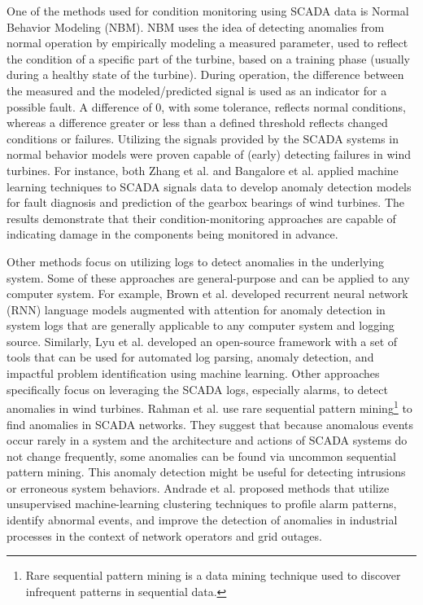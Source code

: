 \par One of the methods used for condition monitoring using SCADA data is Normal Behavior
Modeling (NBM). NBM uses the idea of detecting anomalies from normal operation by
empirically modeling a measured parameter, used to reflect the condition of a specific part of
the turbine, based on a training phase (usually during a healthy state of the turbine). During
operation, the difference between the measured and the modeled/predicted signal is used as an
indicator for a possible fault. A difference of 0, with some tolerance, reflects normal conditions,
whereas a difference greater or less than a defined threshold reflects changed conditions or failures. Utilizing the signals provided 
by the SCADA systems in normal behavior models were proven capable of (early) detecting failures in wind turbines.
For instance, both Zhang et al. \cite{Zhang_Wang} and Bangalore et al. \cite{Bangalore_1} applied machine learning techniques to SCADA signals data to develop anomaly detection models 
for fault diagnosis and prediction of the gearbox bearings of wind turbines. 
The results demonstrate that their condition-monitoring approaches are capable of indicating damage in the components being monitored in advance.

\par Other methods focus on utilizing logs to detect anomalies in the underlying system. Some of these approaches are general-purpose 
and can be applied to any computer system. For example, Brown et al. \cite{RNN} developed recurrent neural network (RNN) language models augmented with attention 
for anomaly detection in system logs that are generally applicable to any computer system and logging source. 
Similarly, Lyu et al. \cite{LogPAI} developed an open-source framework with a set of tools that can be used for automated log parsing, 
anomaly detection, and impactful problem identification using machine learning.
Other approaches specifically focus on leveraging the SCADA logs, especially alarms, to detect anomalies in wind turbines.
Rahman et al. \cite{sequence} use rare sequential pattern mining\footnote{Rare sequential pattern mining is a data mining technique used to discover infrequent patterns in sequential data.} 
to find anomalies in SCADA networks. 
They suggest that because anomalous events occur rarely in a system and the architecture and actions of SCADA systems do not change frequently, 
some anomalies can be found via uncommon sequential pattern mining. This anomaly detection might be useful for detecting intrusions or erroneous system behaviors.
Andrade et al. \cite{Cluster} proposed methods that utilize unsupervised machine-learning clustering techniques to profile alarm patterns, identify abnormal events, and improve the detection of anomalies in 
industrial processes in the context of network operators and grid outages.


